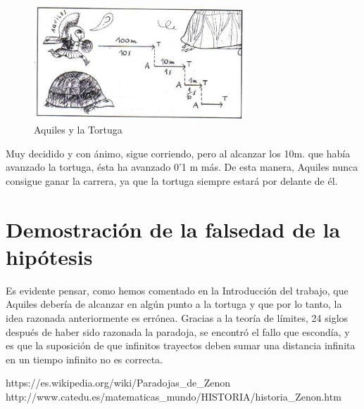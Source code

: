 \documentclass[a4paper,12pt]{article}
\begin{document}
   \begin{figure}[h]
   \begin{center}
   \includegraphics[width=8cm]{Imagenes/aquiles2.jpg}
   \end{center}
   \caption{Aquiles y la Tortuga}
   \label{fig:playa}
   \end{figure}
   
   Muy decidido y con ánimo, sigue corriendo, pero al alcanzar los 10m.
   que había avanzado la tortuga, ésta ha avanzado 0'1 m más.  
   De esta manera, Aquiles nunca consigue ganar la carrera, ya que la tortuga
   siempre estará por delante de él.
   
   \section{Demostración de la falsedad de la hipótesis}
   
   Es evidente pensar, como hemos comentado en la Introducción del trabajo, que Aquiles
   debería de alcanzar en algún punto a la tortuga y que por lo tanto, la idea razonada
   anteriormente es errónea. Gracias a la teoría de límites, 24 siglos después de haber sido
   razonada la paradoja, se encontró el fallo que escondía, y es que la suposición de que infinitos 
   trayectos deben sumar una distancia infinita en un tiempo infinito no es correcta.
      
   \newpage
   
   \begin{thebibliography}{99}
   
       https://es.wikipedia.org/wiki/Paradojas\_de\_Zenon
       http://www.catedu.es/matematicas\_mundo/HISTORIA/historia\_Zenon.htm
      
      
   \end{thebibliography}
  
\end{document}
